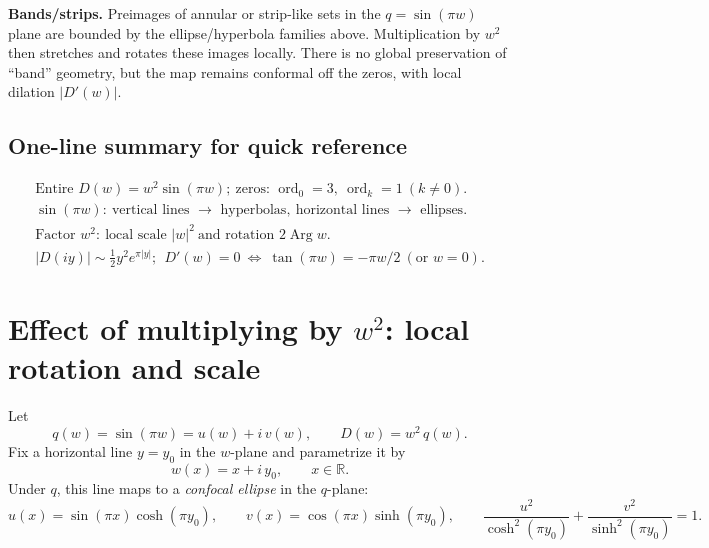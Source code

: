 \documentclass[12pt,a4paper]{article}
\DeclareMathOperator{\Arg}{Arg}
\begin{document}
\medskip
\textbf{Bands/strips.} Preimages of annular or strip-like sets in the \(q=\sin(\pi w)\) plane are bounded by the ellipse/hyperbola families above. Multiplication by \(w^{2}\) then stretches and rotates these images locally. There is no global preservation of “band” geometry, but the map remains conformal off the zeros, with local dilation \(|D'(w)|\).

\subsection*{One-line summary for quick reference}

\[
\boxed{
	\begin{array}{l}
		\text{Entire } D(w)=w^{2}\sin(\pi w);\ \text{zeros: }\operatorname{ord}_{0}=3,\ \operatorname{ord}_{k}=1\ (k\neq0).\\[0.3em]
		\sin(\pi w):\ \text{vertical lines }\to\text{ hyperbolas},\ \text{horizontal lines }\to\text{ ellipses}.\\[0.3em]
		\text{Factor }w^{2}:\ \text{local scale }|w|^{2}\ \text{and rotation }2\Arg w.\\[0.3em]
		|D(iy)|\sim \tfrac12 y^{2}e^{\pi|y|};\ \ D'(w)=0\ \Leftrightarrow\ \tan(\pi w)=-\pi w/2\ (\text{or }w=0).
	\end{array}
}
\]

\section*{Effect of multiplying by \(w^{2}\): local rotation and scale}

Let
\[
q(w)=\sin(\pi w)=u(w)+i\,v(w),\qquad D(w)=w^{2}\,q(w).
\]
Fix a horizontal line \(y=y_{0}\) in the \(w\)-plane and parametrize it by
\[
w(x)=x+i\,y_{0},\qquad x\in\mathbb{R}.
\]
Under \(q\), this line maps to a \emph{confocal ellipse} in the \(q\)-plane:
\[
u(x)=\sin(\pi x)\cosh(\pi y_{0}),\qquad
v(x)=\cos(\pi x)\sinh(\pi y_{0}),\qquad
\frac{u^{2}}{\cosh^{2}(\pi y_{0})}+\frac{v^{2}}{\sinh^{2}(\pi y_{0})}=1.
\]
\end{document}
